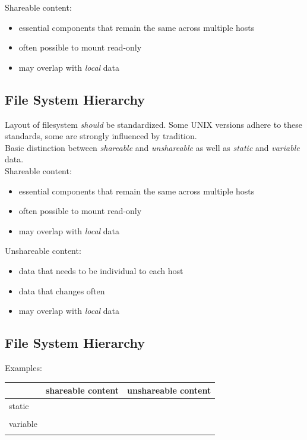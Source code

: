 \documentclass[xga]{xdvislides}
\begin{document}
Shareable content:
\begin{itemize}
	\item essential components that remain the same across multiple hosts
	\item often possible to mount read-only
	\item may overlap with {\em local} data
\end{itemize}

\subsection{File System Hierarchy}
Layout of filesystem {\em should} be standardized.  Some UNIX versions adhere
to these standards, some are strongly influenced by tradition.
\\

Basic distinction between {\em shareable} and {\em unshareable} as well
as {\em static} and {\em variable} data.
\\

Shareable content:
\begin{itemize}
	\item essential components that remain the same across multiple hosts
	\item often possible to mount read-only
	\item may overlap with {\em local} data
\end{itemize}

Unshareable content:
\begin{itemize}
	\item data that needs to be individual to each host
	\item data that changes often
	\item may overlap with {\em local} data
\end{itemize}

\subsection{File System Hierarchy}
Examples:
\\

\begin{center}
\begin{tabular}{| l | l | l |}
	\hline
	& shareable content & unshareable content \\
	\hline
	static   & & \\
	         & & \\
	\hline
	variable & & \\
	         & & \\
	\hline
\end{tabular}
\end{center}
\end{document}

